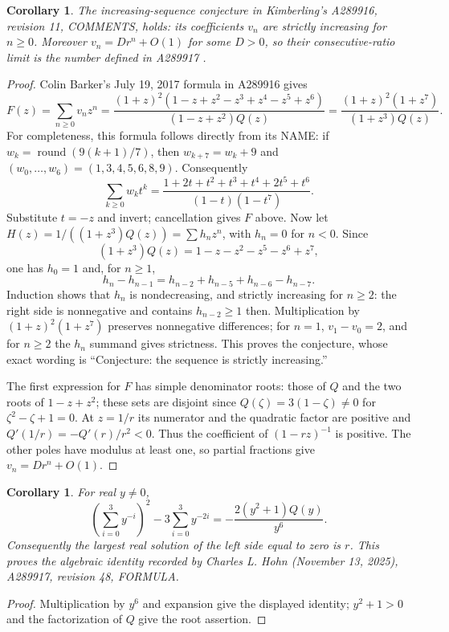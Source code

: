 \documentclass[11pt]{article}
\newtheorem{corollary}[theorem]{Corollary}
\begin{document}
\begin{corollary}\label{cor:kimberling}
The increasing-sequence conjecture in Kimberling's A289916, revision 11,
COMMENTS, holds: its coefficients $v_n$ are strictly increasing for
$n\ge0$. Moreover $v_n=D r^n+O(1)$ for some $D>0$, so their
consecutive-ratio limit is the number defined in A289917 \cite{kimberling}.
\end{corollary}
\begin{proof}
Colin Barker's July 19, 2017 formula in A289916 gives
\[
 F(z)=\sum_{n\ge0}v_nz^n
 =\frac{(1+z)^2(1-z+z^2-z^3+z^4-z^5+z^6)}
 {(1-z+z^2)Q(z)}
 =\frac{(1+z)^2(1+z^7)}{(1+z^3)Q(z)}.
\]
For completeness, this formula follows directly from its NAME:
if $w_k=\operatorname{round}(9(k+1)/7)$, then $w_{k+7}=w_k+9$ and
$(w_0,\ldots,w_6)=(1,3,4,5,6,8,9)$.
Consequently
\[
 \sum_{k\ge0}w_kt^k
 =\frac{1+2t+t^2+t^3+t^4+2t^5+t^6}{(1-t)(1-t^7)}.
\]
Substitute $t=-z$ and invert; cancellation gives $F$ above.
Now let $H(z)=1/((1+z^3)Q(z))=\sum h_nz^n$, with $h_n=0$ for $n<0$.
Since
\[
 (1+z^3)Q(z)=1-z-z^2-z^5-z^6+z^7,
\]
one has $h_0=1$ and, for $n\ge1$,
\[
 h_n-h_{n-1}=h_{n-2}+h_{n-5}+h_{n-6}-h_{n-7}.
\]
Induction shows that $h_n$ is nondecreasing, and strictly increasing
for $n\ge2$: the right side is nonnegative and contains
$h_{n-2}\ge1$ then. Multiplication by $(1+z)^2(1+z^7)$ preserves
nonnegative differences; for $n=1$, $v_1-v_0=2$, and for $n\ge2$
the $h_n$ summand gives strictness. This proves the conjecture,
whose exact wording is ``Conjecture: the sequence is strictly increasing.''

The first expression for $F$ has simple denominator roots: those of
$Q$ and the two roots of $1-z+z^2$; these sets are disjoint since
$Q(\zeta)=3(1-\zeta)\ne0$ for $\zeta^2-\zeta+1=0$.
At $z=1/r$ its numerator and the quadratic factor are positive and
$Q'(1/r)=-Q'(r)/r^2<0$. Thus the coefficient of $(1-rz)^{-1}$
is positive. The other poles have modulus at least one, so partial
fractions give $v_n=D r^n+O(1)$.
\end{proof}

\begin{corollary}\label{cor:descartes}
For real $y\ne0$,
\[
 \left(\sum_{i=0}^3y^{-i}\right)^2-3\sum_{i=0}^3y^{-2i}
 =-\frac{2(y^2+1)Q(y)}{y^6}.
\]
Consequently the largest real solution of the left side equal to zero
is $r$. This proves the algebraic identity recorded by Charles L. Hohn
(November 13, 2025), A289917, revision 48, FORMULA.
\end{corollary}
\begin{proof}
Multiplication by $y^6$ and expansion give the displayed identity;
$y^2+1>0$ and the factorization of $Q$ give the root assertion.
\end{proof}
\end{document}
